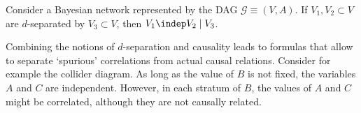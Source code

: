     \begin{property}
        Consider a Bayesian network represented by the DAG $\mathcal{G}\equiv(V,A)$. If $V_1,V_2\subset V$ are $d$-separated by $V_3\subset V$, then $V_1\indep V_2\mid V_3$.
    \end{property}


    Combining the notions of $d$-separation and causality leads to formulas that allow to separate `spurious' correlations from actual causal relations. Consider for example the collider diagram. As long as the value of $B$ is not fixed, the variables $A$ and $C$ are independent. However, in each stratum of $B$, the values of $A$ and $C$ might be correlated, although they are not causally related.